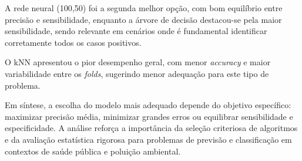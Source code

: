 \documentclass[conference]{IEEEtran}
\begin{document}
A rede neural (100,50) foi a segunda melhor opção, com bom equilíbrio entre precisão e sensibilidade, enquanto a árvore de decisão destacou-se pela maior sensibilidade, sendo relevante em cenários onde é fundamental identificar corretamente todos os casos positivos.

O kNN apresentou o pior desempenho geral, com menor \textit{accuracy} e maior variabilidade entre os \textit{folds}, sugerindo menor adequação para este tipo de problema.

Em síntese, a escolha do modelo mais adequado depende do objetivo específico: maximizar precisão média, minimizar grandes erros ou equilibrar sensibilidade e especificidade. A análise reforça a importância da seleção criteriosa de algoritmos e da avaliação estatística rigorosa para problemas de previsão e classificação em contextos de saúde pública e poluição ambiental.
\end{document}
